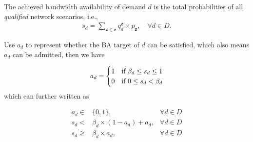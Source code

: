 \documentclass[sigconf]{acmart}
\begin{document}
\begin{appendices}
The achieved bandwidth availability of demand $d$ is the total probabilities of all \textit{qualified} network scenarios, i.e., 
\begin{eqnarray} \label{S}
s_d=\sum_{\mathbf{z}\in \mathbf{z}}q_d^{\mathbf{z}}\times p_{\mathbf{z}},  \quad \forall  d \in D.
\end{eqnarray}

Use $a_d$ to represent whether the BA target of $d$ can be satisfied, which also means $a_d$ can be admitted, then we have 

\begin{equation*}
a_d=
\begin{cases}
1 &\text{if $ \beta_{d} \le s_d \le 1$}\\
0 &\text{if $ 0 \le s_d< \beta_{d} $}
\end{cases}
\label{availability4}
\end{equation*}
which can further written as

\begin{equation}
\label{g-2}
\begin{array}{rll}
a_d\in & \!\!\{0,1\},& \forall d \in D \\
s_d < & \!\!\beta_{d}\times  (1-a_d)+a_d,& \forall d \in D \\
s_d \ge & \!\!\beta_{d} \times a_d,& \forall d \in D \\
\end{array}
\end{equation}


\end{appendices}
\end{document}
